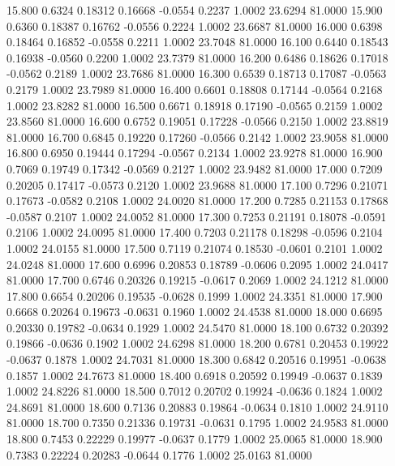   15.800   0.6324   0.18312   0.16668  -0.0554   0.2237   1.0002  23.6294  81.0000
  15.900   0.6360   0.18387   0.16762  -0.0556   0.2224   1.0002  23.6687  81.0000
  16.000   0.6398   0.18464   0.16852  -0.0558   0.2211   1.0002  23.7048  81.0000
  16.100   0.6440   0.18543   0.16938  -0.0560   0.2200   1.0002  23.7379  81.0000
  16.200   0.6486   0.18626   0.17018  -0.0562   0.2189   1.0002  23.7686  81.0000
  16.300   0.6539   0.18713   0.17087  -0.0563   0.2179   1.0002  23.7989  81.0000
  16.400   0.6601   0.18808   0.17144  -0.0564   0.2168   1.0002  23.8282  81.0000
  16.500   0.6671   0.18918   0.17190  -0.0565   0.2159   1.0002  23.8560  81.0000
  16.600   0.6752   0.19051   0.17228  -0.0566   0.2150   1.0002  23.8819  81.0000
  16.700   0.6845   0.19220   0.17260  -0.0566   0.2142   1.0002  23.9058  81.0000
  16.800   0.6950   0.19444   0.17294  -0.0567   0.2134   1.0002  23.9278  81.0000
  16.900   0.7069   0.19749   0.17342  -0.0569   0.2127   1.0002  23.9482  81.0000
  17.000   0.7209   0.20205   0.17417  -0.0573   0.2120   1.0002  23.9688  81.0000
  17.100   0.7296   0.21071   0.17673  -0.0582   0.2108   1.0002  24.0020  81.0000
  17.200   0.7285   0.21153   0.17868  -0.0587   0.2107   1.0002  24.0052  81.0000
  17.300   0.7253   0.21191   0.18078  -0.0591   0.2106   1.0002  24.0095  81.0000
  17.400   0.7203   0.21178   0.18298  -0.0596   0.2104   1.0002  24.0155  81.0000
  17.500   0.7119   0.21074   0.18530  -0.0601   0.2101   1.0002  24.0248  81.0000
  17.600   0.6996   0.20853   0.18789  -0.0606   0.2095   1.0002  24.0417  81.0000
  17.700   0.6746   0.20326   0.19215  -0.0617   0.2069   1.0002  24.1212  81.0000
  17.800   0.6654   0.20206   0.19535  -0.0628   0.1999   1.0002  24.3351  81.0000
  17.900   0.6668   0.20264   0.19673  -0.0631   0.1960   1.0002  24.4538  81.0000
  18.000   0.6695   0.20330   0.19782  -0.0634   0.1929   1.0002  24.5470  81.0000
  18.100   0.6732   0.20392   0.19866  -0.0636   0.1902   1.0002  24.6298  81.0000
  18.200   0.6781   0.20453   0.19922  -0.0637   0.1878   1.0002  24.7031  81.0000
  18.300   0.6842   0.20516   0.19951  -0.0638   0.1857   1.0002  24.7673  81.0000
  18.400   0.6918   0.20592   0.19949  -0.0637   0.1839   1.0002  24.8226  81.0000
  18.500   0.7012   0.20702   0.19924  -0.0636   0.1824   1.0002  24.8691  81.0000
  18.600   0.7136   0.20883   0.19864  -0.0634   0.1810   1.0002  24.9110  81.0000
  18.700   0.7350   0.21336   0.19731  -0.0631   0.1795   1.0002  24.9583  81.0000
  18.800   0.7453   0.22229   0.19977  -0.0637   0.1779   1.0002  25.0065  81.0000
  18.900   0.7383   0.22224   0.20283  -0.0644   0.1776   1.0002  25.0163  81.0000

